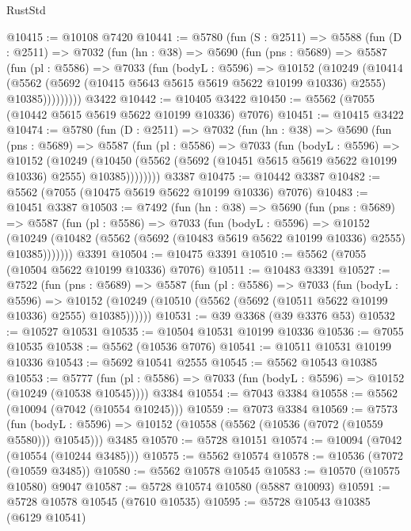\begin{lexlean}{RustStd}
\begin{coremodule}
@10415 := @10108 @7420
@10441 := @5780
    (fun (S : @2511) =>
    @5588
      (fun (D : @2511) =>
      @7032
        (fun (hn : @38) =>
        @5690
          (fun (pns : @5689) =>
          @5587
            (fun (pl : @5586) =>
            @7033
              (fun (bodyL : @5596) =>
              @10152
                (@10249
                  (@10414
                    (@5562
                      (@5692 (@10415 @5643 @5615 @5619 @5622 @10199 @10336) @2555)
                      @10385)))))))))
    @3422
@10442 := @10405 @3422
@10450 := @5562 (@7055 (@10442 @5615 @5619 @5622 @10199 @10336) @7076)
@10451 := @10415 @3422
@10474 := @5780
    (fun (D : @2511) =>
    @7032
      (fun (hn : @38) =>
      @5690
        (fun (pns : @5689) =>
        @5587
          (fun (pl : @5586) =>
          @7033
            (fun (bodyL : @5596) =>
            @10152
              (@10249
                (@10450 (@5562 (@5692 (@10451 @5615 @5619 @5622 @10199 @10336) @2555) @10385))))))))
    @3387
@10475 := @10442 @3387
@10482 := @5562 (@7055 (@10475 @5619 @5622 @10199 @10336) @7076)
@10483 := @10451 @3387
@10503 := @7492
    (fun (hn : @38) =>
    @5690
      (fun (pns : @5689) =>
      @5587
        (fun (pl : @5586) =>
        @7033
          (fun (bodyL : @5596) =>
          @10152
            (@10249 (@10482 (@5562 (@5692 (@10483 @5619 @5622 @10199 @10336) @2555) @10385)))))))
    @3391
@10504 := @10475 @3391
@10510 := @5562 (@7055 (@10504 @5622 @10199 @10336) @7076)
@10511 := @10483 @3391
@10527 := @7522
    (fun (pns : @5689) =>
    @5587
      (fun (pl : @5586) =>
      @7033
        (fun (bodyL : @5596) =>
        @10152 (@10249 (@10510 (@5562 (@5692 (@10511 @5622 @10199 @10336) @2555) @10385))))))
@10531 := @39 @3368 (@39 @3376 @53)
@10532 := @10527 @10531
@10535 := @10504 @10531 @10199 @10336
@10536 := @7055 @10535
@10538 := @5562 (@10536 @7076)
@10541 := @10511 @10531 @10199 @10336
@10543 := @5692 @10541 @2555
@10545 := @5562 @10543 @10385
@10553 := @5777
    (fun (pl : @5586) => @7033 (fun (bodyL : @5596) => @10152 (@10249 (@10538 @10545))))
    @3384
@10554 := @7043 @3384
@10558 := @5562 (@10094 (@7042 (@10554 @10245)))
@10559 := @7073 @3384
@10569 := @7573
    (fun (bodyL : @5596) => @10152 (@10558 (@5562 (@10536 (@7072 (@10559 @5580))) @10545)))
    @3485
@10570 := @5728 @10151
@10574 := @10094 (@7042 (@10554 (@10244 @3485)))
@10575 := @5562 @10574
@10578 := @10536 (@7072 (@10559 @3485))
@10580 := @5562 @10578 @10545
@10583 := @10570 (@10575 @10580) @9047
@10587 := @5728 @10574 @10580 (@5887 @10093)
@10591 := @5728 @10578 @10545 (@7610 @10535)
@10595 := @5728 @10543 @10385 (@6129 @10541)

\end{coremodule}
\end{lexlean}
